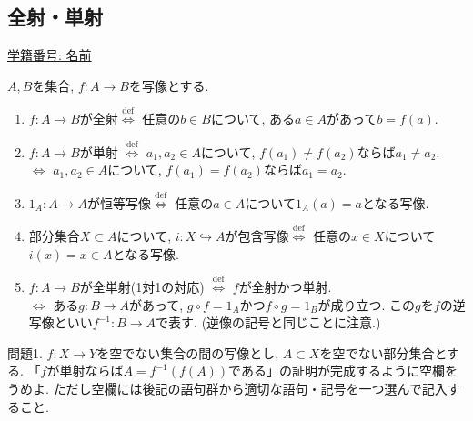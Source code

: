 \documentclass[dvipdfmx,a4paper,11pt]{article}
\theoremstyle{definition}
\begin{document}

 \newpage
 \begin{center}
\section{全射・単射}
\label{sec-4}
\end{center}
 \begin{flushleft}
{ \large \underline{学籍番号: \hspace{4cm} 名前  \hspace{8.5cm}}}
{\footnotesize }
\end{flushleft}


\begin{tcolorbox}[
    colback = white,
    colframe = black!35!black,
    fonttitle = \bfseries,
    breakable = true]
    $A,B$を集合, $f :A \to B$を写像とする. 
    \begin{enumerate}
    \setlength{\parskip}{0cm} 
  \setlength{\itemsep}{0cm} 
    \item $f :A \to B$が全射$\stackrel{\mathrm{def}}{\Longleftrightarrow}$ 任意の$b \in B$について, ある$a \in A$があって$b = f(a)$.
    \item $f :A \to B$が単射 $\stackrel{\mathrm{def}}{\Longleftrightarrow}$ $a_1, a_2 \in A$について, $f(a_1) \neq f(a_2)$ならば$a_1 \neq a_2$.
    \\ $\stackrel{}{\Longleftrightarrow}$ $a_1, a_2 \in A$について, $f(a_1)=f(a_2)$ならば$a_1 = a_2$.
    \item $1_{A}: A \to A$が恒等写像$\stackrel{\mathrm{def}}{\Longleftrightarrow}$ 任意の$a \in A$について$1_A(a)=a$となる写像. 
    \item 部分集合$X \subset A$について, $i : X\hookrightarrow A$が包含写像$\stackrel{\mathrm{def}}{\Longleftrightarrow}$ 任意の$x \in X$について$i(x)=x \in A$となる写像. 
    \item $f :A \to B$が全単射(1対1の対応) $\stackrel{\mathrm{def}}{\Longleftrightarrow}$ $f$が全射かつ単射.
    \\ $\stackrel{}{\Longleftrightarrow}$ ある$g : B\to A$があって, $g \circ f = 1_A$かつ$f \circ g = 1_B$が成り立つ. この$g$を$f$の逆写像といい$f^{-1} : B \to A$で表す. (逆像の記号と同じことに注意.)
    \end{enumerate}
 \end{tcolorbox}
 
 \medskip
 問題1. $f : X \to Y$を空でない集合の間の写像とし, $A \subset X$を空でない部分集合とする.
 「$f$が単射ならば$A=f^{-1}(f(A))$である」の証明が完成するように空欄をうめよ. 
ただし空欄には後記の語句群から適切な語句・記号を一つ選んで記入すること.
\end{document}
